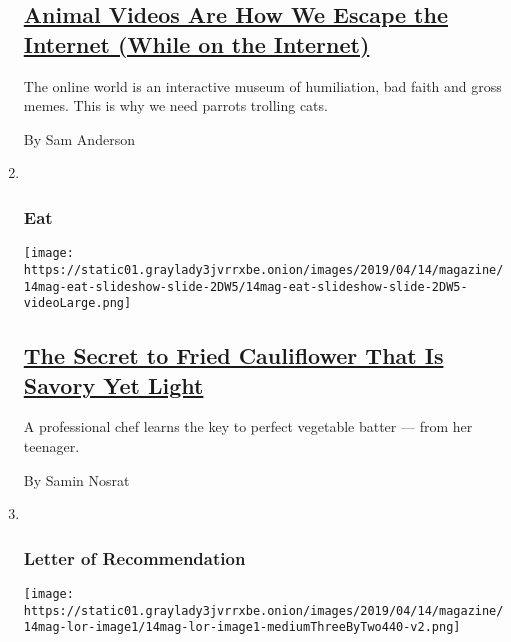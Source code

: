 \begin{enumerate}
  \hypertarget{animal-videos-are-how-we-escape-the-internet-while-on-the-internet}{%
  \subsection{\texorpdfstring{\href{/2019/04/09/magazine/animal-videos-are-how-we-escape-the-internet-while-on-the-internet.html}{Animal
  Videos Are How We Escape the Internet (While on the
  Internet)}}{Animal Videos Are How We Escape the Internet (While on the Internet)}}\label{animal-videos-are-how-we-escape-the-internet-while-on-the-internet}}

  The online world is an interactive museum of humiliation, bad faith
  and gross memes. This is why we need parrots trolling cats.

  By Sam Anderson
\item ~
  \hypertarget{eat}{%
  \subsubsection{Eat}\label{eat}}

  \texttt{[image: https://static01.graylady3jvrrxbe.onion/images/2019/04/14/magazine/14mag-eat-slideshow-slide-2DW5/14mag-eat-slideshow-slide-2DW5-videoLarge.png]}

  \hypertarget{the-secret-to-fried-cauliflower-that-is-savory-yet-light}{%
  \subsection{\texorpdfstring{\href{/2019/04/10/magazine/fried-cauliflower-recipe.html}{The
  Secret to Fried Cauliflower That Is Savory Yet
  Light}}{The Secret to Fried Cauliflower That Is Savory Yet Light}}\label{the-secret-to-fried-cauliflower-that-is-savory-yet-light}}

  A professional chef learns the key to perfect vegetable batter ---
  from her teenager.

  By Samin Nosrat
\item ~
  \hypertarget{letter-of-recommendation}{%
  \subsubsection{Letter of
  Recommendation}\label{letter-of-recommendation}}

  \texttt{[image: https://static01.graylady3jvrrxbe.onion/images/2019/04/14/magazine/14mag-lor-image1/14mag-lor-image1-mediumThreeByTwo440-v2.png]}

  \hypertarget{letter-of-recommendation-spuds-mackenzie}{%
}
\end{enumerate}
